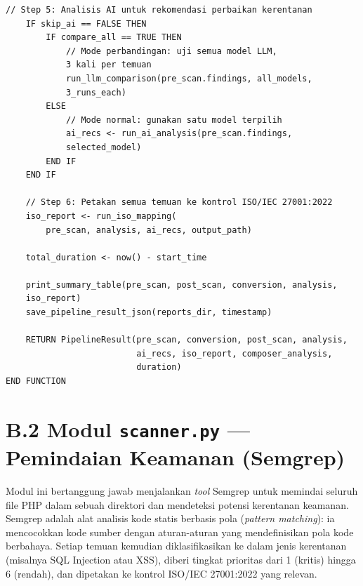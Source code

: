 \begin{lstlisting}[style=pseudocodestyle]
    // Step 5: Analisis AI untuk rekomendasi perbaikan kerentanan
    IF skip_ai == FALSE THEN
        IF compare_all == TRUE THEN
            // Mode perbandingan: uji semua model LLM, 
            3 kali per temuan
            run_llm_comparison(pre_scan.findings, all_models, 
            3_runs_each)
        ELSE
            // Mode normal: gunakan satu model terpilih
            ai_recs <- run_ai_analysis(pre_scan.findings, 
            selected_model)
        END IF
    END IF

    // Step 6: Petakan semua temuan ke kontrol ISO/IEC 27001:2022
    iso_report <- run_iso_mapping(
        pre_scan, analysis, ai_recs, output_path)

    total_duration <- now() - start_time

    print_summary_table(pre_scan, post_scan, conversion, analysis, 
    iso_report)
    save_pipeline_result_json(reports_dir, timestamp)

    RETURN PipelineResult(pre_scan, conversion, post_scan, analysis,
                          ai_recs, iso_report, composer_analysis, 
                          duration)
END FUNCTION
\end{lstlisting}

\section*{B.2 Modul \texttt{scanner.py} --- Pemindaian Keamanan (Semgrep)}

Modul ini bertanggung jawab menjalankan \textit{tool} Semgrep untuk memindai
seluruh file PHP dalam sebuah direktori dan mendeteksi potensi kerentanan
keamanan. Semgrep adalah alat analisis kode statis berbasis pola
(\textit{pattern matching}): ia mencocokkan kode sumber dengan aturan-aturan
yang mendefinisikan pola kode berbahaya. Setiap temuan kemudian diklasifikasikan
ke dalam jenis kerentanan (misalnya SQL Injection atau XSS), diberi tingkat
prioritas dari 1 (kritis) hingga 6 (rendah), dan dipetakan ke kontrol
ISO/IEC 27001:2022 yang relevan.

